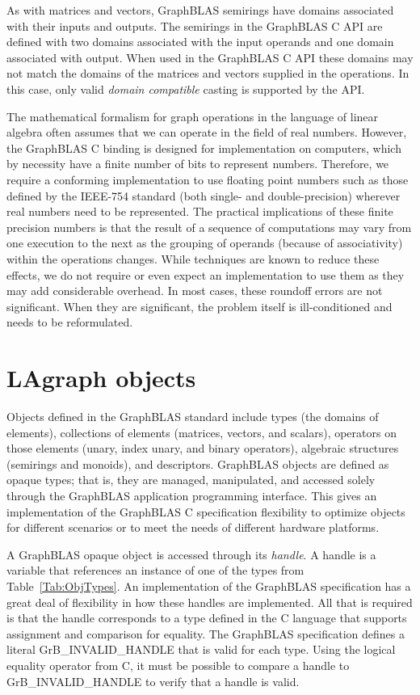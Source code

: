 As with matrices and vectors, GraphBLAS semirings have domains
associated with their inputs and outputs.  The semirings in the 
GraphBLAS C API are defined with two domains associated with the input operands and one 
domain associated with output.  When used in the GraphBLAS C API these
domains may not match the domains of the matrices and vectors supplied in
the operations.  In this case, only valid \emph{domain compatible} casting 
is supported by the API.

The mathematical formalism for graph operations in the language of 
linear algebra often assumes that we can operate in the field of real numbers. 
However, the GraphBLAS C binding is designed for implementation on computers, 
which by necessity have a finite number of bits to represent numbers. 
Therefore, we require a conforming implementation to use floating point 
numbers such as those defined by the IEEE-754 standard (both single- and double-precision) 
wherever real numbers need to be represented. The practical implications of 
these finite precision numbers is that the result of a sequence of 
computations may vary from one execution to the next as the grouping of operands
(because of associativity) within the operations changes.  While techniques are known to 
reduce these effects, we do not require or even expect an implementation 
to use them as they may add considerable overhead. In most 
cases, these roundoff errors are not significant. When they are significant, 
the problem itself is ill-conditioned and needs to be reformulated.


\section{LAgraph  objects}

Objects defined in the GraphBLAS standard include types (the domains of 
elements), collections of elements (matrices, vectors, and scalars), operators 
on those elements (unary, index unary, and binary operators), algebraic 
structures (semirings and monoids), and descriptors.   GraphBLAS objects are 
defined as opaque types; that is, they are managed, manipulated, and accessed 
solely through the GraphBLAS application programming interface. This gives an 
implementation of the GraphBLAS C specification flexibility to optimize objects 
for different scenarios or to meet the needs of different hardware platforms.

A GraphBLAS opaque object is accessed through its \emph{handle}.  A handle is 
a variable that references an instance of one of the types from 
Table~\ref{Tab:ObjTypes}.  An implementation of the GraphBLAS specification 
has a great deal of flexibility in how these handles are implemented.  All 
that is required is that the handle corresponds to a type defined in the 
C language that supports assignment and comparison for equality.  The
GraphBLAS specification defines a literal {\sf GrB\_INVALID\_HANDLE} that is 
valid for each type.  Using the logical equality operator from C, it must be 
possible to compare a handle to {\sf GrB\_INVALID\_HANDLE} to verify that a 
handle is valid.


